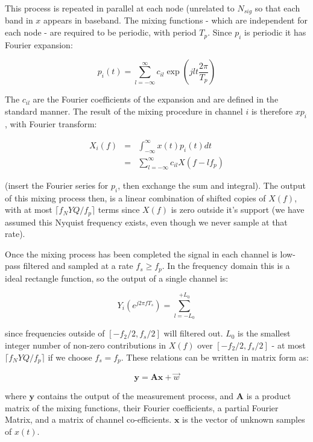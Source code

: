 \documentclass{article}
\begin{document}
This process is repeated in parallel at each node (unrelated to \(N_{sig}\) so that each band in \(x\) appears in baseband. The mixing functions - which are independent for each node - are required to be periodic, with period \(T_p\). Since \(p_i\) is periodic it has Fourier expansion:

\begin{equation}
p_i\left(t\right) = \sum_{l=-\infty}^{\infty} c_{il} \exp\left({jlt\frac{2\pi}{T_p}}\right)
\end{equation}

The \(c_{il}\) are the Fourier coefficients of the expansion and are defined in the standard manner. The result of the mixing procedure in channel \(i\) is therefore \(xp_i\), with Fourier transform:

\begin{align}
X_{i}\left(f\right) &=& \int_{-\infty}^{\infty} x\left(t\right) p_i\left(t\right) dt
\\ &=& \sum_{l=-\infty}^{\infty} c_{il} X\left(f-lf_p\right)
\end{align}

(insert the Fourier series for \(p_i\), then exchange the sum and integral). The output of this mixing process then, is a linear combination of shifted copies of \(X\left(f\right)\), with at most \(\lceil f_NYQ/f_p\rceil\) terms since \(X\left(f\right)\) is zero outside it's support (we have assumed this Nyquist frequency exists, even though we never sample at that rate).

Once the mixing process has been completed the signal in each channel is low-pass filtered and sampled at a rate \(f_s \geq f_p\). In the frequency domain this is a ideal rectangle function, so the output of a single channel is:

\begin{equation}
Y_i\left(e^{j 2 \pi f T_s }\right) = \sum_{l = -L_0}^{+L_0}
\end{equation}

since frequencies outside of \([-f_2/2, f_s/2]\) will filtered out. \(L_0\) is the smallest integer number of non-zero contributions in \(X\left(f\right)\) over \([-f_2/2, f_s/2]\) - at most \(\lceil f_NYQ/f_p\rceil\) if we choose \(f_s = f_p\). These relations can be written in matrix form as:

\begin{equation}
\textbf{y} = \textbf{A}\textbf{x} + \vec{w}
\end{equation}

where \(\textbf{y}\) contains the output of the measurement process, and \(\textbf{A}\) is a product matrix of the mixing functions, their Fourier coefficients, a partial Fourier Matrix, and a matrix of channel co-efficients. \(\textbf{x}\) is the vector of unknown samples of \(x\left(t\right)\). 
\end{document}

